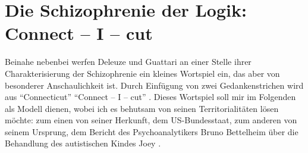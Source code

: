 \documentclass[12pt,
               paper=a4,
               twoside=false,
               onehalfspacing,
               bibliography=totoc,
               toc=graduated,
               ]{scrartcl}
\newcommand{\pc}[2]{\parencite[#1]{#2}}
\newcommand{\worries}[1]{\ifdraft{\textcolor{blue}{\texttt{(#1)}}}{}}
\newcommand{\gwg}{G--W--G'\xspace}
\newcommand{\cic}{Connect -- I -- cut\xspace}
\newcommand{\dg}{Deleuze und Guattari\xspace}
\begin{document}











\section{Die Schizophrenie der Logik: \cic}

%

Beinahe nebenbei werfen \dg an einer Stelle ihrer Charakterisierung
der Schizophrenie ein kleines Wortspiel ein, das aber von besonderer
Anschaulichkeit ist. Durch Einfügung von zwei Gedankenstrichen wird
aus "`Connecticut"' "`\cic"' \pc{48}{ao}. Dieses Wortspiel soll mir im
Folgenden als Modell dienen, wobei ich es behutsam von seinen
Territorialitäten lösen möchte: zum einen von seiner Herkunft, dem
US-Bundesstaat, zum anderen von seinem Ursprung, dem Bericht des
Psychoanalytikers Bruno Bettelheim über die Behandlung des
autistischen Kindes Joey \parencites[vgl.][]{joey}[306-446]{emptyf}.
\end{document}
